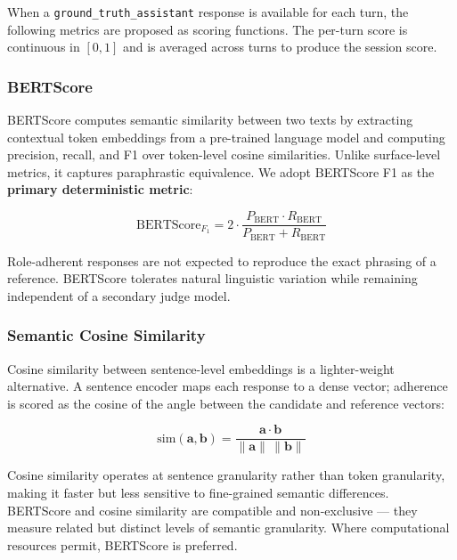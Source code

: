 \documentclass[11pt,a4paper]{article}
\begin{document}
When a \texttt{ground\_truth\_assistant} response is available for each turn,
the following metrics are proposed as scoring functions. The per-turn score is
continuous in $[0, 1]$ and is averaged across turns to produce the session
score.

\subsubsection{BERTScore}

BERTScore \citep{zhang2020bertscore} computes semantic similarity between two
texts by extracting contextual token embeddings from a pre-trained language
model and computing precision, recall, and F1 over token-level cosine
similarities. Unlike surface-level metrics, it captures paraphrastic
equivalence. We adopt BERTScore F1 as the \textbf{primary deterministic
metric}:

\begin{equation}
  \text{BERTScore}_{F_1} = 2 \cdot \frac{P_{\text{BERT}} \cdot R_{\text{BERT}}}
  {P_{\text{BERT}} + R_{\text{BERT}}}
\end{equation}

Role-adherent responses are not expected to reproduce the exact phrasing of a
reference. BERTScore tolerates natural linguistic variation while remaining
independent of a secondary judge model.

\subsubsection{Semantic Cosine Similarity}

Cosine similarity between sentence-level embeddings \citep{reimers2019sentencebert}
is a lighter-weight alternative. A sentence encoder maps each response to a
dense vector; adherence is scored as the cosine of the angle between the
candidate and reference vectors:

\begin{equation}
  \text{sim}(\mathbf{a}, \mathbf{b}) =
  \frac{\mathbf{a} \cdot \mathbf{b}}{\|\mathbf{a}\|\,\|\mathbf{b}\|}
\end{equation}

Cosine similarity operates at sentence granularity rather than token
granularity, making it faster but less sensitive to fine-grained semantic
differences. BERTScore and cosine similarity are compatible and non-exclusive
--- they measure related but distinct levels of semantic granularity. Where
computational resources permit, BERTScore is preferred.
\end{document}
